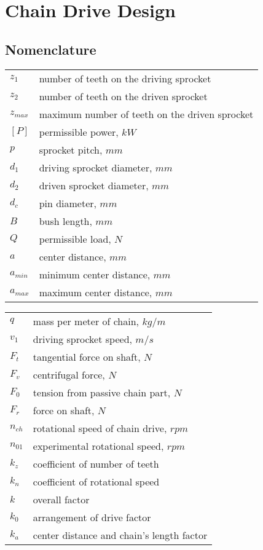 \chapter{Chain Drive Design}
\section{Nomenclature}
\begin{tabular}[t]{lp{7cm}}
		$ z_1 $ & number of teeth on the driving sprocket\\
		$ z_2 $ & number of teeth on the driven sprocket\\
		$ z_{max} $ & maximum number of teeth on the driven sprocket\\
		$ [P] $ & permissible power, $ kW $\\
		$ p $ & sprocket pitch, $ mm $\\
		$ d_1 $ & driving sprocket diameter, $ mm $\\
		$ d_2 $ & driven sprocket diameter, $ mm $\\
		$ d_c $ & pin diameter, $ mm $\\
		$ B $ & bush length, $ mm $\\
		$ Q $ & permissible load, $ N $\\
		$ a $ & center distance, $ mm $\\
		$ a_{min} $ & minimum center distance, $ mm $\\
		$ a_{max} $ & maximum center distance, $ mm $\\
\end{tabular}
\begin{tabular}[t]{lp{7cm}}
		
		$ q $ & mass per meter of chain, $ kg/m $\\
		$ v_1 $ & driving sprocket speed, $ m/s $\\
		$ F_t $ & tangential force on shaft, $ N $\\
		$ F_v $ & centrifugal force, $ N $\\
		$ F_0 $ & tension from passive chain part, $ N $\\
		$ F_r $ & force on shaft, $ N $\\
		$ n_{ch} $ & rotational speed of chain drive, $ rpm $\\
		$ n_{01} $ & experimental rotational speed, $ rpm $\\
		$ k_z $ & coefficient of number of teeth\\
		$ k_n $ & coefficient of rotational speed\\
		$ k $ & overall factor\\
		$ k_0 $ & arrangement of drive factor\\
		$ k_a $ & center distance and chain's length factor\\			
\end{tabular}\newpage
